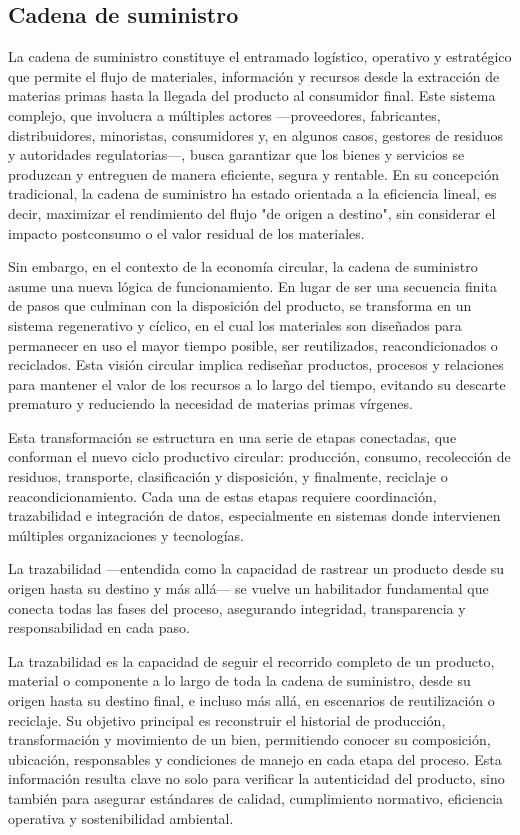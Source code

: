 \subsection{Cadena de suministro}

La cadena de suministro constituye el entramado logístico, operativo y estratégico que permite el flujo de materiales, información y recursos desde la extracción de materias primas hasta la llegada del producto al consumidor final. Este sistema complejo, que involucra a múltiples actores —proveedores, fabricantes, distribuidores, minoristas, consumidores y, en algunos casos, gestores de residuos y autoridades regulatorias—, busca garantizar que los bienes y servicios se produzcan y entreguen de manera eficiente, segura y rentable. En su concepción tradicional, la cadena de suministro ha estado orientada a la eficiencia lineal, es decir, maximizar el rendimiento del flujo "de origen a destino", sin considerar el impacto postconsumo o el valor residual de los materiales.

Sin embargo, en el contexto de la economía circular, la cadena de suministro asume una nueva lógica de funcionamiento. En lugar de ser una secuencia finita de pasos que culminan con la disposición del producto, se transforma en un sistema regenerativo y cíclico, en el cual los materiales son diseñados para permanecer en uso el mayor tiempo posible, ser reutilizados, reacondicionados o reciclados. Esta visión circular implica rediseñar productos, procesos y relaciones para mantener el valor de los recursos a lo largo del tiempo, evitando su descarte prematuro y reduciendo la necesidad de materias primas vírgenes.

Esta transformación se estructura en una serie de etapas conectadas, que conforman el nuevo ciclo productivo circular: producción, consumo, recolección de residuos, transporte, clasificación y disposición, y finalmente, reciclaje o reacondicionamiento. Cada una de estas etapas requiere coordinación, trazabilidad e integración de datos, especialmente en sistemas donde intervienen múltiples organizaciones y tecnologías. 

La trazabilidad —entendida como la capacidad de rastrear un producto desde su origen hasta su destino y más allá— se vuelve un habilitador fundamental que conecta todas las fases del proceso, asegurando integridad, transparencia y responsabilidad en cada paso.


La trazabilidad es la capacidad de seguir el recorrido completo de un producto, material o componente a lo largo de toda la cadena de suministro, desde su origen hasta su destino final, e incluso más allá, en escenarios de reutilización o reciclaje. Su objetivo principal es reconstruir el historial de producción, transformación y movimiento de un bien, permitiendo conocer su composición, ubicación, responsables y condiciones de manejo en cada etapa del proceso. Esta información resulta clave no solo para verificar la autenticidad del producto, sino también para asegurar estándares de calidad, cumplimiento normativo, eficiencia operativa y sostenibilidad ambiental.

